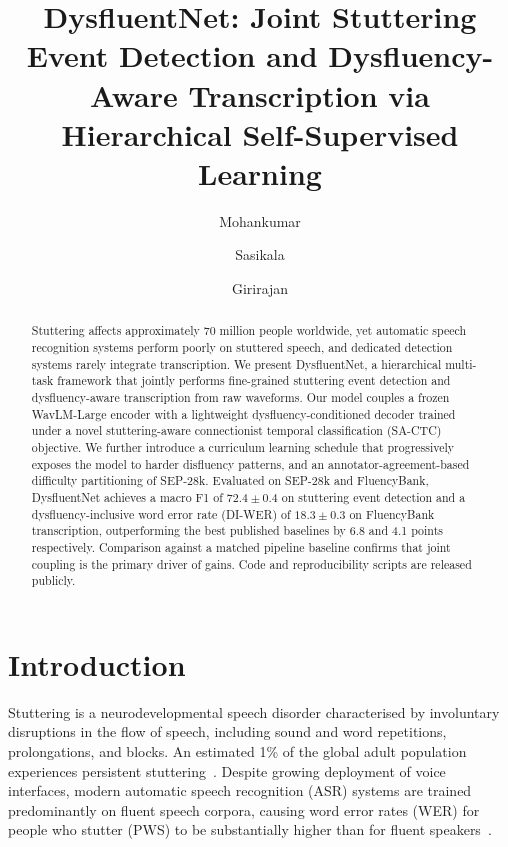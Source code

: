\documentclass[cameraready]{Interspeech}
\title{DysfluentNet: Joint Stuttering Event Detection and Dysfluency-Aware
       Transcription via Hierarchical Self-Supervised Learning}
\author[affiliation={1},orcid=0009-0000-1917-2732, equalcontribution]{Mohankumar}{Muthu}
\author[affiliation={1},orcid=0000-0002-1848-7692, equalcontribution, correspondingauthor]{Sasikala}{E}
\author[affiliation={2},orcid=0000-0003-4978-542X]{Girirajan}{S}
\begin{document}
\maketitle

\begin{abstract}
Stuttering affects approximately 70 million people worldwide, yet automatic
speech recognition systems perform poorly on stuttered speech, and dedicated
detection systems rarely integrate transcription. We present DysfluentNet, a
hierarchical multi-task framework that jointly performs fine-grained stuttering
event detection and dysfluency-aware transcription from raw waveforms. Our
model couples a frozen WavLM-Large encoder with a lightweight
dysfluency-conditioned decoder trained under a novel stuttering-aware
connectionist temporal classification (SA-CTC) objective. We further introduce
a curriculum learning schedule that progressively exposes the model to harder
disfluency patterns, and an annotator-agreement-based difficulty partitioning
of SEP-28k. Evaluated on SEP-28k and FluencyBank, DysfluentNet achieves a
macro F1 of $72.4 \pm 0.4$ on stuttering event detection and a
dysfluency-inclusive word error rate (DI-WER) of $18.3 \pm 0.3$ on FluencyBank
transcription, outperforming the best published baselines by 6.8 and 4.1 points
respectively. Comparison against a matched pipeline baseline confirms that
joint coupling is the primary driver of gains. Code and reproducibility scripts are
released publicly.
\end{abstract}

\section{Introduction}

Stuttering is a neurodevelopmental speech disorder characterised by involuntary
disruptions in the flow of speech, including sound and word repetitions,
prolongations, and blocks. An estimated 1\% of the global adult population
experiences persistent stuttering~\cite{guitar2019}. Despite growing deployment
of voice interfaces, modern automatic speech recognition (ASR) systems are
trained predominantly on fluent speech corpora, causing word error rates (WER)
for people who stutter (PWS) to be substantially higher than for fluent
speakers~\cite{lea2021sep28k}.
\end{document}
